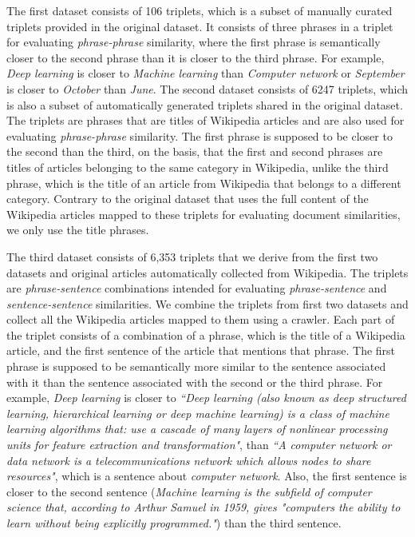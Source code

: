 \documentclass[conference]{IEEEtran}
\begin{document}
The first dataset consists of 106 triplets, which is a subset of manually curated triplets provided in the original dataset. It consists of three phrases in a triplet for evaluating \textit{phrase-phrase} similarity, where the first phrase is semantically closer to the second phrase than it is closer to the third phrase. For example, \textit{Deep learning} is closer to \textit{Machine learning} than \textit{Computer network} or \textit{September} is closer to \textit{October} than \textit{June}. The second dataset consists of 6247 triplets, which is also a subset of automatically generated triplets shared in the original dataset. The triplets are phrases that are titles of Wikipedia articles and are also used for evaluating \textit{phrase-phrase} similarity. The first phrase is supposed to be closer to the second than the third, on the basis, that the first and second phrases are titles of articles belonging to the same category in Wikipedia, unlike the third phrase, which is the title of an article from Wikipedia that belongs to a different category. Contrary to the original dataset that uses the full content of the Wikipedia articles mapped to these triplets for evaluating document similarities, we only use the title phrases.

The third dataset consists of 6,353 triplets that we derive from the first two datasets and original articles automatically collected from Wikipedia. The triplets are \textit{phrase-sentence} combinations intended for evaluating \textit{phrase-sentence} and \textit{sentence-sentence} similarities. We combine the triplets from first two datasets and collect all the Wikipedia articles mapped to them using a crawler. Each part of the triplet consists of a combination of a phrase, which is the title of a Wikipedia article, and the first sentence of the article that mentions that phrase. The first phrase is supposed to be semantically more similar to the sentence associated with it than the sentence associated with the second or the third phrase. For example, \textit{Deep learning} is closer to \textit{``Deep learning (also known as deep structured learning, hierarchical learning or deep machine learning) is a class of machine learning algorithms that: use a cascade of many layers of nonlinear processing units for feature extraction and transformation"}, than \textit{``A computer network or data network is a telecommunications network which allows nodes to share resources"}, which is a sentence about \textit{computer network}. Also, the first sentence is closer to the second sentence (\textit{Machine learning is the subfield of computer science that, according to Arthur Samuel in 1959, gives "computers the ability to learn without being explicitly programmed."}) than the third sentence.
\end{document}
